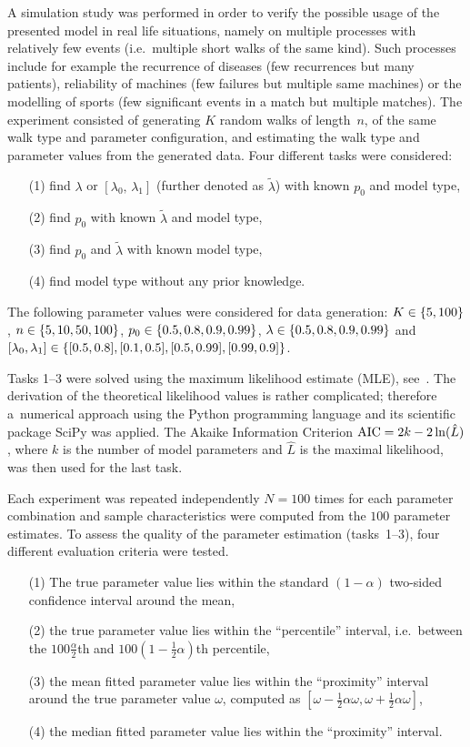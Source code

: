 A simulation study was performed in order to verify the possible usage of the
presented model in real life situations, namely on multiple processes
with relatively few events
(i.e.~multiple short walks of the same kind).
Such processes include for example the recurrence of diseases (few recurrences
but many patients), reliability of machines (few failures but multiple same machines)
or the modelling of sports (few significant events in a match but multiple matches).
The experiment consisted of generating $K$ random walks of length~$n$,\vadjust{\goodbreak}
of the same walk type and parameter configuration, and estimating the walk type and parameter values from the generated data.
Four different tasks were considered:
\begin{itemize}
\item[(1)] find $\lambda$ or $[\lambda_{0},\,\lambda_{1}]$ (further denoted as $\tilde{\lambda}$) with known $p_{0}$ and model type,
\item[(2)] find $p_{0}$ with known $\tilde{\lambda}$ and model type,
\item[(3)] find $p_{0}$ and $\tilde{\lambda}$ with known model type,
\item[(4)] find model type without any prior knowledge.
\end{itemize}
\bgroup\let\,\relax
The following parameter values were considered for data generation: $K\in\{5,\,100\}$, $n\in\{5,\,10,\,50,\,100\}$, $p_{0}\in\{0.5,\,0.8,\,0.9,\,0.99\}$, $\lambda\in\{0.5,\,0.8,\,0.9,\,0.99\}$ and $[\lambda_{0},\,\lambda_{1}]\in\{[0.5,\,0.8],\,[0.1,\,0.5],\,[0.5,\,0.99],\,[0.99,\,0.9]\}$.\egroup


Tasks 1--3 were solved using the maximum likelihood estimate (MLE), see~\cite{rossi2018mathematical}.
The derivation of the theoretical likelihood values is rather complicated; therefore a~numerical approach using the Python programming language and its scientific package SciPy was applied.
The Akaike Information Criterion ${\rm AIC}=2k-2\ln(\hat{L})$, where $k$ is the number of model parameters and $\hat{L}$ is the maximal likelihood, was then used for the last task.

Each experiment was repeated independently $N=100$ times for each parameter combination and sample characteristics were computed from the $100$ parameter estimates.
To assess the quality of the parameter estimation (tasks~1--3), four different evaluation criteria were tested.
\begin{itemize}
\item[(1)] The true parameter value lies within the standard $(1-\alpha)$ two-sided confidence interval around the mean,
\item[(2)] the true parameter value lies within the ``percentile'' interval, i.e.~between the $100\frac{{\alpha}}{2}$th and $100(1-\frac{1}{2}\alpha)$th percentile,
\item[(3)] the mean fitted parameter value lies within the ``proximity'' interval around the true parameter value $\omega$, computed as $[\omega-\frac{1}{2}\alpha\omega,\omega+\frac{1}{2}\alpha\omega]$,
\item[(4)] the median fitted parameter value lies within the ``proximity'' interval.
\end{itemize}

